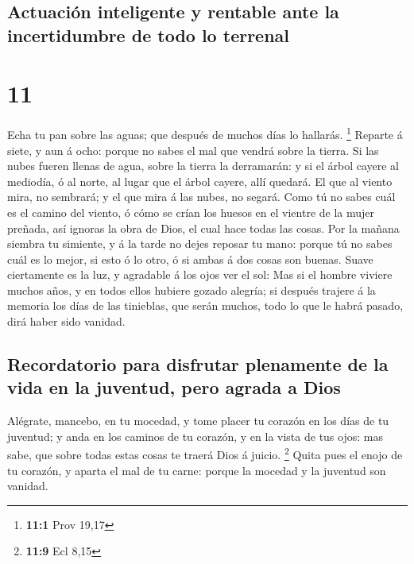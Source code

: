 \hypertarget{actuaciuxf3n-inteligente-y-rentable-ante-la-incertidumbre-de-todo-lo-terrenal}{%
\subsection{Actuación inteligente y rentable ante la incertidumbre de
todo lo
terrenal}\label{actuaciuxf3n-inteligente-y-rentable-ante-la-incertidumbre-de-todo-lo-terrenal}}

\hypertarget{section-10}{%
\section{11}\label{section-10}}

 Echa tu pan sobre las aguas; que después de muchos días lo
hallarás. \footnote{\textbf{11:1} Prov 19,17}  Reparte á
siete, y aun á ocho: porque no sabes el mal que vendrá sobre la tierra.
 Si las nubes fueren llenas de agua, sobre la tierra la
derramarán: y si el árbol cayere al mediodía, ó al norte, al lugar que
el árbol cayere, allí quedará.  El que al viento mira, no
sembrará; y el que mira á las nubes, no segará.  Como tú no
sabes cuál es el camino del viento, ó cómo se crían los huesos en el
vientre de la mujer preñada, así ignoras la obra de Dios, el cual hace
todas las cosas.  Por la mañana siembra tu simiente, y á la
tarde no dejes reposar tu mano: porque tú no sabes cuál es lo mejor, si
esto ó lo otro, ó si ambas á dos cosas son buenas.  Suave
ciertamente es la luz, y agradable á los ojos ver el sol: 
Mas si el hombre viviere muchos años, y en todos ellos hubiere gozado
alegría; si después trajere á la memoria los días de las tinieblas, que
serán muchos, todo lo que le habrá pasado, dirá haber sido vanidad.

\hypertarget{recordatorio-para-disfrutar-plenamente-de-la-vida-en-la-juventud-pero-agrada-a-dios}{%
\subsection{Recordatorio para disfrutar plenamente de la vida en la
juventud, pero agrada a
Dios}\label{recordatorio-para-disfrutar-plenamente-de-la-vida-en-la-juventud-pero-agrada-a-dios}}

 Alégrate, mancebo, en tu mocedad, y tome placer tu corazón
en los días de tu juventud; y anda en los caminos de tu corazón, y en la
vista de tus ojos: mas sabe, que sobre todas estas cosas te traerá Dios
á juicio. \footnote{\textbf{11:9} Ecl 8,15}  Quita pues el
enojo de tu corazón, y aparta el mal de tu carne: porque la mocedad y la
juventud son vanidad.

